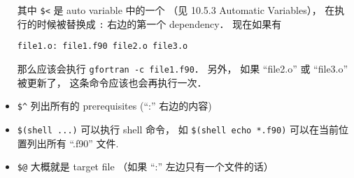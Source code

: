 \begin{itemize}
\begin{lstlisting}
\end{lstlisting}
其中 \lstinline|$<| 是 auto variable 中的一个 （见 10.5.3 Automatic Variables）， 在执行的时候被替换成 \lstinline|:| 右边的第一个 dependency． 现在如果有
\begin{lstlisting}
file1.o: file1.f90 file2.o file3.o
\end{lstlisting}
那么应该会执行 \lstinline|gfortran -c file1.f90|． 另外， 如果 “file2.o” 或 “file3.o” 被更新了， 这条命令应该也会再执行一次．
\item \lstinline|$^| 列出所有的 prerequisites (“:” 右边的内容)
\item \lstinline|$(shell ...)| 可以执行 shell 命令， 如 \lstinline|$(shell echo *.f90)| 可以在当前位置列出所有 “.f90” 文件.
\item \lstinline|$@| 大概就是 target file （如果 “:” 左边只有一个文件的话）
\end{itemize}
